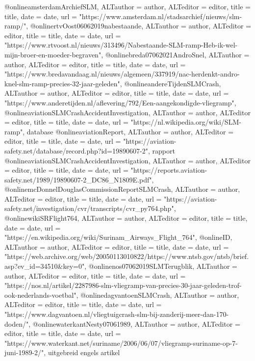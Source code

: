 {{{{{@online{amsterdamArchiefSLM,	ALTauthor = {author},	ALTeditor = {editor},	title = {title},	date = {date},	url = {"https://www.amsterdam.nl/stadsarchief/nieuws/slm-ramp/"},}
@online{rtvOost06062019nabestaande,	ALTauthor = {author},	ALTeditor = {editor},	title = {title},	date = {date},	url = {"https://www.rtvoost.nl/nieuws/313496/Nabestaande-SLM-ramp-Heb-ik-wel-mijn-broer-en-moeder-begraven"},}
@online{breda07062021AndroSnel,	ALTauthor = {author},	ALTeditor = {editor},	title = {title},	date = {date},	url = {"https://www.bredavandaag.nl/nieuws/algemeen/337919/nac-herdenkt-andro-knel-slm-ramp-precies-32-jaar-geleden"},}
@online{andereTijdenSLMCrash,	ALTauthor = {author},	ALTeditor = {editor},	title = {title},	date = {date},	url = {"https://www.anderetijden.nl/aflevering/792/Een-aangekondigde-vliegramp"},}
@online{aviationSLMCrashAccidentInvestigation,	ALTauthor = {author},	ALTeditor = {editor},	title = {title},	date = {date},	url = {"https://nl.wikipedia.org/wiki/SLM-ramp"},}
database
@online{aviationReport,	ALTauthor = {author},	ALTeditor = {editor},	title = {title},	date = {date},	url = {"https://aviation-safety.net/database/record.php?id=19890607-2"},}
rapport
@online{aviationSLMCrashAccidentInvestigation,	ALTauthor = {author},	ALTeditor = {editor},	title = {title},	date = {date},	url = {"https://reports.aviation-safety.net/1989/19890607-2_DC86_N1809E.pdf"},}
@online{mcDonnelDouglasCommissionReportSLMCrash,	ALTauthor = {author},	ALTeditor = {editor},	title = {title},	date = {date},	url = {"https://aviation-safety.net/investigation/cvr/transcripts/cvr_py764.php"},}
@online{wikiSRFlight764,	ALTauthor = {author},	ALTeditor = {editor},	title = {title},	date = {date},	url = {"https://en.wikipedia.org/wiki/Surinam_Airways_Flight_764"},}
@online{ID,	ALTauthor = {author},	ALTeditor = {editor},	title = {title},	date = {date},	url = {"https://web.archive.org/web/20050113010822/https://www.ntsb.gov/ntsb/brief.asp?ev_id=34510&key=0"},}
@online{nos07062019SLMTerugblik,	ALTauthor = {author},	ALTeditor = {editor},	title = {title},	date = {date},	url = {"https://nos.nl/artikel/2287986-slm-vliegramp-van-precies-30-jaar-geleden-trof-ook-nederlands-voetbal"},}
@online{dagvantoenSLMCrash,	ALTauthor = {author},	ALTeditor = {editor},	title = {title},	date = {date},	url = {"https://www.dagvantoen.nl/vliegtuigcrash-slm-bij-zanderij-meer-dan-170-doden/"},}
@online{waterkantNesty07061989,	ALTauthor = {author},	ALTeditor = {editor},	title = {title},	date = {date},	url = {"https://www.waterkant.net/suriname/2006/06/07/vliegramp-suriname-op-7-juni-1989-2/"},}
uitgebreid engels artikel
}}}}}
